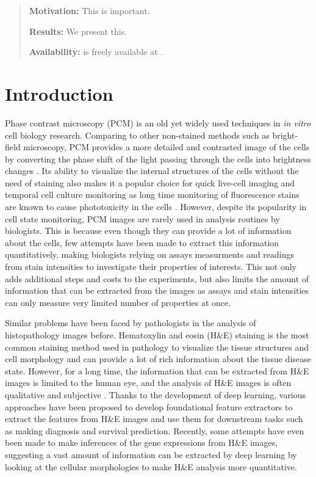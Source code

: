 \begin{refsegment}

\begin{abstract}
  \noindent \textbf{Motivation:} This is important.

  \noindent \textbf{Results:} We present this.

  \noindent \textbf{Availability:}  is freely available at \url{}.
\end{abstract}

\section*{Introduction}

Phase contrast microscopy (PCM) is an old yet widely used techniques in \textit{in vitro} cell biology research. Comparing to other non-stained methods such as bright-field microscopy, PCM provides a more detailed and contrasted image of the cells by converting the phase shift of the light passing through the cells into brightness changes \autocite{pcm_background}. Its ability to visualize the internal structures of the cells without the need of staining also makes it a popular choice for quick live-cell imaging and temporal cell culture monitoring as long time monitoring of fluorescence stains are known to cause phototoxicity in the cells \autocite{phototoxicity}. However, despite its popularity in cell state monitoring, PCM images are rarely used in analysis routines by biologists. This is because even though they can provide a lot of information about the cells, few attempts have been made to extract this information quantitatively, making biologists relying on assays measurments and readings from stain intensities to investigate their properties of interests. This not only adds additional steps and costs to the experiments, but also limits the amount of information that can be extracted from the images as assays and stain intensities can only measure very limited number of properties at once.

Similar problems have been faced by pathologists in the analysis of histopathology images before. Hematoxylin and eosin (H\&E) staining is the most common staining method used in pathology to visualize the tissue structures and cell morphology and can provide a lot of rich information about the tissue disease state. However, for a long time, the information that can be extracted from H\&E images is limited to the human eye, and the analysis of H\&E images is often qualitative and subjective \autocite{he_stain}. Thanks to the development of deep learning, various approaches have been proposed to develop foundational feature extractors to extract the features from H\&E images and use them for downstream tasks such as making diagnosis and survival prediction. Recently, some attempts have even been made to make inferences of the gene expressions from H\&E images, suggesting a vast amount of information can be extracted by deep learning by looking at the cellular morphologies to make H\&E analysis more quantitative. 



\end{refsegment}
